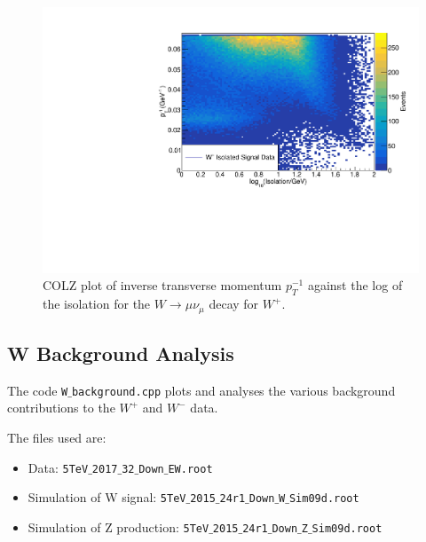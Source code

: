\documentclass[a4paper]{article}
\begin{document}
\begin{figure}[!hb]
    \centering
    \includegraphics[clip, trim = 0cm 0cm 0.3cm 1.3cm, width=\textwidth]{../doc/measurement_doc/W+_isolated_signal_COLZ.pdf}
    \vspace{-4mm}
    \caption{\small COLZ plot of inverse transverse momentum $p_T^{-1}$ against the log of the isolation for the $W \xrightarrow{} \mu \nu_\mu$ decay for $W^+$.}
    \label{fig: COLZ} %
\end{figure}


\subsection{W Background Analysis} \label{sec: W background}

The code \texttt{W$\_$background.cpp} plots and analyses the various background contributions to the $W^+$ and $W^-$ data.

The files used are:
\begin{itemize}
    \item Data: \texttt{5TeV$\_$2017$\_$32$\_$Down$\_$EW.root}
    \item Simulation of W signal: \texttt{5TeV$\_$2015$\_$24r1$\_$Down$\_$W$\_$Sim09d.root}
    \item Simulation of Z production: \texttt{5TeV$\_$2015$\_$24r1$\_$Down$\_$Z$\_$Sim09d.root}
\end{itemize}
\end{document}
